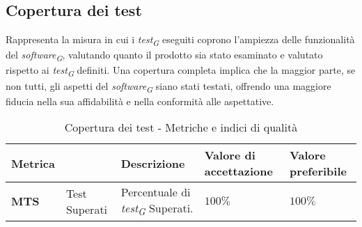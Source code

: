 \subsection{Copertura dei test}
Rappresenta la misura in cui i \textit{test}\textsubscript{\textit{G}} eseguiti coprono l'ampiezza delle funzionalità del \textit{software}\textsubscript{\textit{G}}, valutando quanto il prodotto sia stato esaminato e valutato rispetto ai \textit{test}\textsubscript{\textit{G}} definiti. Una copertura completa implica che la maggior parte, se non tutti, gli aspetti del \textit{software}\textsubscript{\textit{G}} siano stati testati, offrendo una maggiore fiducia nella sua affidabilità e nella conformità alle aspettative.  
\begin{table}[H]
    \centering
    \begin{tabular}{|C{1.5cm}|L{3cm}|L{4cm}|L{2.5cm}|L{2.5cm}|}
        \hline
        \textbf{Metrica} &  & \textbf{Descrizione} & \textbf{Valore di accettazione} & \textbf{Valore preferibile} \\
        \hline
        \textbf{MTS} & Test Superati & Percentuale di \textit{test}\textsubscript{\textit{G}} Superati. & $ 100\%$ & $100\%$ \\
        \hline
    \end{tabular}
    \caption{Copertura dei test - Metriche e indici di qualità}
    \label{tab:copertura_qualita_prodotto}
\end{table}